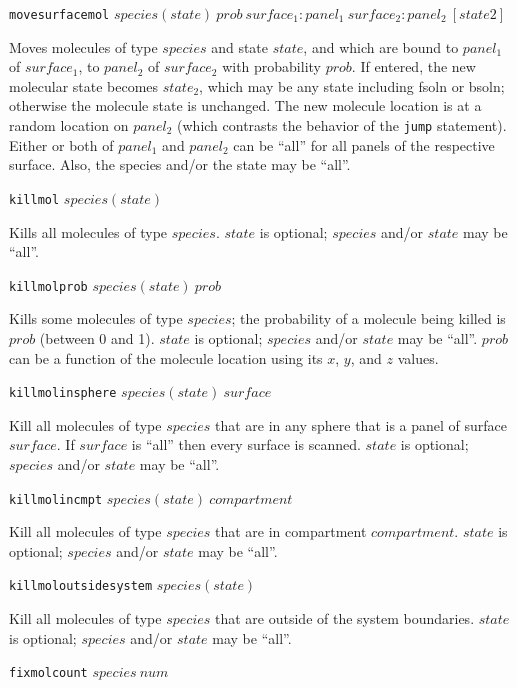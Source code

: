 \documentclass {book}
\newcommand {\ttt} {\texttt}
\begin{document}
\begin{description}
\item{\ttt{movesurfacemol} $species(state)\ prob\ surface_1:panel_1\ surface_2:panel_2\ [state2]$}

Moves molecules of type $species$ and state $state$, and which are bound to $panel_1$ of $surface_1$, to $panel_2$ of $surface_2$ with probability $prob$. If entered, the new molecular state becomes $state_2$, which may be any state including fsoln or bsoln; otherwise the molecule state is unchanged. The new molecule location is at a random location on $panel_2$ (which contrasts the behavior of the \ttt{jump} statement). Either or both of $panel_1$ and $panel_2$ can be ``all'' for all panels of the respective surface. Also, the species and/or the state may be ``all''.

\item{\ttt{killmol} $species(state)$}

Kills all molecules of type $species$. $state$ is optional; $species$ and/or $state$ may be ``all''.

\item{\ttt{killmolprob} $species(state)\ prob$}

Kills some molecules of type $species$; the probability of a molecule being killed is $prob$ (between 0 and 1). $state$ is optional; $species$ and/or $state$ may be ``all''. $prob$ can be a function of the molecule location using its $x$, $y$, and $z$ values.

\item{\ttt{killmolinsphere} $species(state)\ surface$}

Kill all molecules of type $species$ that are in any sphere that is a panel of surface $surface$. If $surface$ is ``all'' then every surface is scanned. $state$ is optional; $species$ and/or $state$ may be ``all''.

\item{\ttt{killmolincmpt} $species(state)\ compartment$}

Kill all molecules of type $species$ that are in compartment $compartment$. $state$ is optional; $species$ and/or $state$ may be ``all''.

\item{\ttt{killmoloutsidesystem} $species(state)$}

Kill all molecules of type $species$ that are outside of the system boundaries. $state$ is optional; $species$ and/or $state$ may be ``all''.

\item{\ttt{fixmolcount} $species\ num$}


\end{description}
\end{document}
